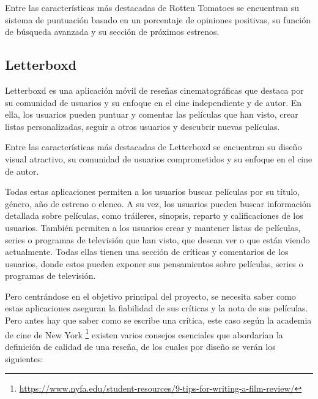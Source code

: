 Entre las características más destacadas de Rotten Tomatoes se encuentran su sistema de puntuación 
basado en un porcentaje de opiniones positivas, su función de búsqueda avanzada y su sección de 
próximos estrenos.

\subsection{Letterboxd}

Letterboxd es una aplicación móvil de reseñas cinematográficas que destaca por su comunidad de 
usuarios y su enfoque en el cine independiente y de autor. En ella, los usuarios pueden puntuar y 
comentar las películas que han visto, crear listas personalizadas, seguir a otros usuarios y descubrir 
nuevas películas.

Entre las características más destacadas de Letterboxd se encuentran su diseño visual atractivo, su 
comunidad de usuarios comprometidos y su enfoque en el cine de autor. \vspace{1cm}



Todas estas aplicaciones permiten a los usuarios buscar películas por su título, género, año 
de estreno o elenco. A su vez, los usuarios pueden buscar información detallada sobre películas,
como tráileres, sinopsis, reparto y calificaciones de los usuarios. También permiten a los 
usuarios crear y mantener listas de películas, series o programas de televisión que han visto, que 
desean ver o que están viendo actualmente. Todas ellas tienen una sección de críticas y comentarios de 
los usuarios, donde estos pueden exponer sus pensamientos sobre películas, series o programas 
de televisión.

Pero centrándose en el objetivo principal del proyecto, se necesita saber como estas aplicaciones aseguran la fiabilidad de sus críticas y la nota de sus películas. Pero antes hay que saber como se escribe una crítica, este caso según la academia de cine de New York \footnote{\url{https://www.nyfa.edu/student-resources/9-tips-for-writing-a-film-review/}} existen varios consejos esenciales que abordarían la definición de calidad de una reseña, de los cuales por diseño se verán los siguientes:

